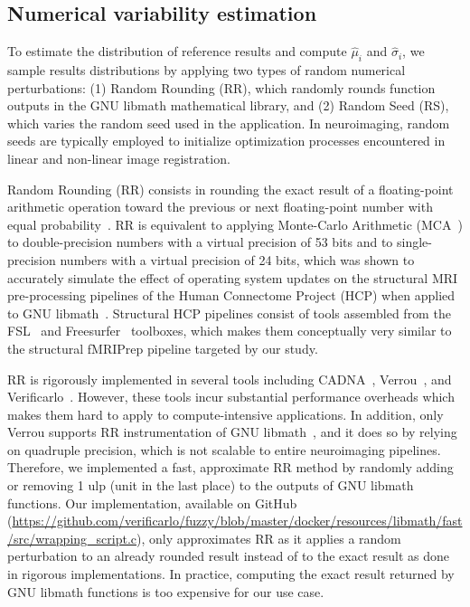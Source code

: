 \documentclass[lettersize,journal]{IEEEtran}
\begin{document}
\subsection{Numerical variability estimation}

To estimate the distribution of reference results and compute $\hat \mu_i$ and $\hat \sigma_i$, we sample results distributions by applying two types of random numerical perturbations: (1) Random Rounding (RR), which randomly rounds function outputs in the GNU libmath mathematical library, and (2) Random Seed (RS), which varies the random seed used in the application. In neuroimaging, random seeds are typically employed to initialize optimization processes encountered in linear and non-linear image registration.

Random Rounding (RR) consists in rounding the exact result of a floating-point arithmetic operation toward the previous or next floating-point number with equal probability~\cite{forsythe1959reprint}. RR is equivalent to applying Monte-Carlo Arithmetic (MCA~\cite{parker1997monte}) to double-precision numbers with a virtual precision of 53 bits and to single-precision numbers with a virtual precision of 24 bits, which was shown to accurately simulate the effect of operating system updates on the structural MRI pre-processing pipelines of the Human Connectome Project (HCP) when applied to GNU libmath~\cite{salari2021accurate}. Structural HCP pipelines consist of tools assembled from the FSL~\cite{jenkinson2012fsl} and Freesurfer~\cite{fischl2012freesurfer} toolboxes, which makes them conceptually very similar to the structural fMRIPrep pipeline targeted by our study.

RR is rigorously implemented in several tools including CADNA~\cite{jezequel2008cadna}, Verrou~\cite{fevotte2016verrou}, and Verificarlo~\cite{denis2016verificarlo}. However, these tools incur substantial performance overheads which makes them hard to apply to compute-intensive applications. In addition, only Verrou supports RR instrumentation of GNU libmath~\cite{fevotte2019debugging}, and it does so by relying on quadruple precision, which is not scalable to entire neuroimaging pipelines. Therefore, we implemented a fast, approximate RR method by randomly adding or removing 1 ulp (unit in the last place) to the outputs of GNU libmath functions. Our implementation, available on GitHub (\url{https://github.com/verificarlo/fuzzy/blob/master/docker/resources/libmath/fast/src/wrapping\_script.c}),  only approximates RR as it applies a random perturbation to an already rounded result instead of to the exact result as done in rigorous implementations. In practice, computing the exact result returned by GNU libmath functions is too expensive for our use case.
\end{document}
